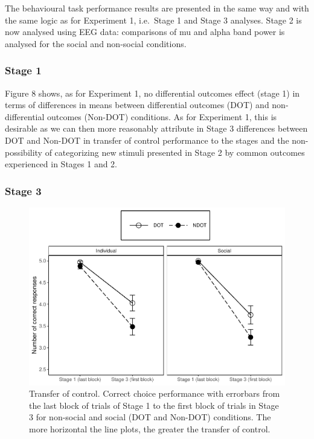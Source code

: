 \documentclass[]{elsarticle} %
\begin{document}
The behavioural task performance results are presented in the same way
and with the same logic as for Experiment 1, i.e.~Stage 1 and Stage 3
analyses. Stage 2 is now analysed using EEG data: comparisons of mu and
alpha band power is analysed for the social and non-social conditions.

\hypertarget{stage-1-1}{%
\subsubsection{Stage 1}\label{stage-1-1}}

Figure 8 shows, as for Experiment 1, no differential outcomes effect
(stage 1) in terms of differences in means between differential outcomes
(DOT) and non-differential outcomes (Non-DOT) conditions. As for
Experiment 1, this is desirable as we can then more reasonably attribute
in Stage 3 differences between DOT and Non-DOT in transfer of control
performance to the stages and the non-possibility of categorizing new
stimuli presented in Stage 2 by common outcomes experienced in Stages 1
and 2.

\hypertarget{stage-3-1}{%
\subsubsection{Stage 3}\label{stage-3-1}}

\begin{figure}

{\centering \includegraphics[width=1\linewidth]{Vicarious_value_learning_master_files/figure-latex/figure8-1} 

}

\caption{Transfer of control. Correct choice performance with errorbars from the last block of trials of Stage 1 to the first block of trials in Stage 3 for non-social and social (DOT and Non-DOT) conditions. The more horizontal the line plots, the greater the transfer of control.}\label{fig:figure8}
\end{figure}
\end{document}
